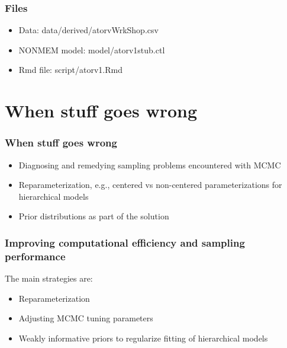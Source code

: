 \documentclass{beamer}
\begin{document}
\begin{frame}
  \frametitle{Files}
  
  \begin{itemize}
  \item Data: data/derived/atorvWrkShop.csv
    \item NONMEM model: model/atorv1stub.ctl
    \item Rmd file: script/atorv1.Rmd
  \end{itemize}

\end{frame}

\section{When stuff goes wrong}

\begin{frame}
  \frametitle{When stuff goes wrong}
  
  \begin{itemize}
  \item Diagnosing and remedying sampling problems encountered with MCMC
\item Reparameterization, e.g., centered vs non-centered parameterizations for hierarchical models
\item Prior distributions as part of the solution
  \end{itemize}

\end{frame}

\begin{frame}
  \frametitle{Improving computational efficiency and sampling
    performance}
  
The main strategies are:
\begin{itemize}
\item Reparameterization
\item Adjusting MCMC tuning parameters
\item Weakly informative priors to regularize fitting of hierarchical models
\end{itemize}

\end{frame}
\end{document}
